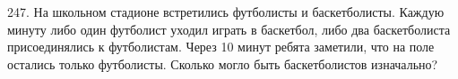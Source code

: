 247. На школьном стадионе встретились футболисты и баскетболисты. Каждую минуту либо один футболист уходил играть в баскетбол, либо два баскетболиста присоединялись к футболистам. Через 10 минут ребята заметили, что на поле остались только футболисты. Сколько могло быть баскетболистов изначально?\\
